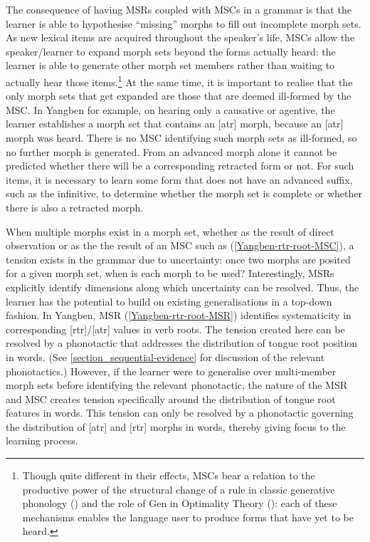 The consequence of having MSRs coupled with MSCs in a grammar is that the learner is able to hypothesise ``missing'' morphs to fill out incomplete morph sets. As new lexical items are acquired throughout the speaker's life, MSCs allow the speaker/learner to expand morph sets beyond the forms actually heard: the learner is able to generate other morph set members rather than waiting to actually hear those items.\footnote{Though quite different in their effects, MSCs bear a relation to the productive power of the structural change of a rule in classic generative phonology (\citealt{Chomsky+:1968, Kenstowicz+:1979}) and the role of  Gen in Optimality Theory (\citealt{Prince+:1993}): each of these mechanisms enables the language user to produce forms that have yet to be heard.} \label{page-section-MSR-vs-rules-or-GEN} At the same time, it is important to realise that the only morph sets that get expanded are those that are deemed ill-formed by the MSC. In Yangben for example, on hearing only a causative or agentive, the learner establishes a morph set that contains an [atr] morph, because an [atr] morph was heard. There is no MSC identifying such morph sets as ill-formed, so no further morph is generated. From an advanced morph alone it cannot be predicted whether there will be a corresponding retracted form or not. For such items, it is necessary to learn some form that does not have an advanced suffix, such as the infinitive,  to determine whether the morph set is complete or whether there is also a retracted morph. 

\largerpage
When multiple morphs exist in a morph set, whether as the result of direct observation or as the the result of an MSC such as (\ref{Yangben-rtr-root-MSC}), a tension exists in the grammar due to uncertainty: once two morphs are posited for a given morph set, when is each morph to be used? Interestingly, MSRs explicitly identify dimensions along which uncertainty can be resolved. Thus, the learner has the potential to build on existing generalisations in a top-down fashion. In Yangben, MSR\down{\sc [tr]} (\ref{Yangben-rtr-root-MSR}) identifies  systematicity in corresponding [rtr]/[atr] values in verb roots. The tension created here can be resolved by a phonotactic that addresses the distribution of tongue root position in words. (See \Sec\ref{section_sequential-evidence} for discussion of the relevant phonotactics.) However, if the learner were to generalise over multi-member morph sets before identifying the relevant phonotactic, the nature of the MSR\down{\sc [tr]} and MSC\down{\sc [tr]} creates tension specifically around the distribution of tongue root features in words. This tension can only be resolved by a  phonotactic governing the distribution of [atr] and [rtr] morphs in words, thereby giving focus to the learning process.


